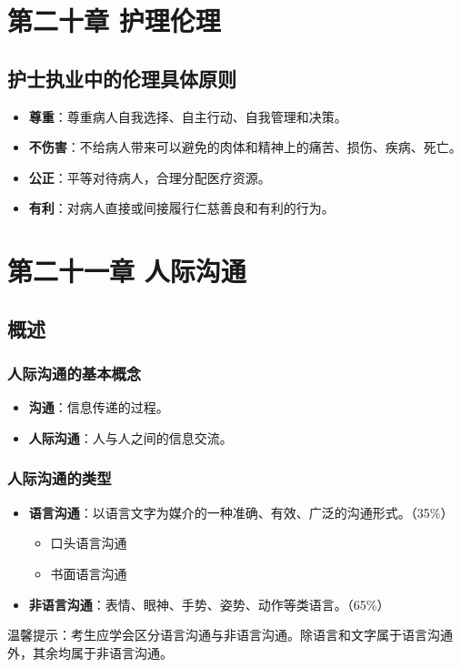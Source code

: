 \documentclass[11pt, a4paper]{ctexart}
\newcommand{\ocrimage}[1]{\texttt{#1}}
\begin{document}
\section{第二十章 护理伦理}
\subsection{护士执业中的伦理具体原则}
\begin{itemize}
    \item \textbf{尊重}：尊重病人自我选择、自主行动、自我管理和决策。
    \item \textbf{不伤害}：不给病人带来可以避免的肉体和精神上的痛苦、损伤、疾病、死亡。
    \item \textbf{公正}：平等对待病人，合理分配医疗资源。
    \item \textbf{有利}：对病人直接或间接履行仁慈善良和有利的行为。
\end{itemize}

\section{第二十一章 人际沟通}
\subsection{概述}
\subsubsection{人际沟通的基本概念}
\begin{itemize}
    \item \textbf{沟通}：信息传递的过程。
    \item \textbf{人际沟通}：人与人之间的信息交流。
\end{itemize}

\subsubsection{人际沟通的类型}
\begin{itemize}
    \item \textbf{语言沟通}：以语言文字为媒介的一种准确、有效、广泛的沟通形式。（35\%）
    \begin{itemize}
        \item 口头语言沟通
        \item 书面语言沟通
    \end{itemize}
    \item \textbf{非语言沟通}：表情、眼神、手势、姿势、动作等类语言。（65\%）
\end{itemize}
温馨提示：考生应学会区分语言沟通与非语言沟通。除语言和文字属于语言沟通外，其余均属于非语言沟通。
\end{document}
